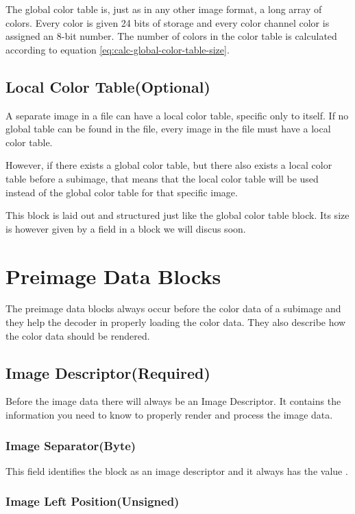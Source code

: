 The global color table is, just as in any other image format, a long
array of colors. Every color is given 24 bits of storage and every
color channel color is assigned an 8-bit number. The number of colors
in the color table is calculated according to equation \ref{eq:calc-global-color-table-size}.

\subsection{Local Color Table(Optional)}

A separate image in a \gif file can have a local color table, specific
only to itself. If no global table can be found in the file, every
image in the \gif file must have a local color table.

However, if there exists a global color table, but there also exists a
local color table before a subimage, that means that the local color
table will be used instead of the global color table for that specific
image.

This block is laid out and structured just like the global color table
block. Its size is however given by a field in a block we will discus
soon.

\section{Preimage Data Blocks}

The preimage data blocks always occur before the color data of a
subimage and they help the decoder in properly loading the color
data. They also describe how the color data should be rendered.

\subsection{Image Descriptor(Required)}

Before the image data there will always be an Image Descriptor. It
contains the information you need to know to properly render and
process the image data.

\subsubsection{Image Separator(Byte)}

This field identifies the block as an image descriptor and it always
has the value .

\subsubsection{Image Left Position(Unsigned)}
